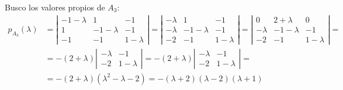 \begin{ejercicio}
\begin{enumerate}
        Busco los valores propios de $A_3$:
        \begin{equation*}\begin{split}
            p_{A_3}(\lambda)&
            =\left|\begin{array}{ccc}
                -1-\lambda & 1 & -1 \\
                1 & -1-\lambda & -1 \\
                -1 & -1 & 1-\lambda
            \end{array}\right|
            =\left|\begin{array}{ccc}
                -\lambda & 1 & -1 \\
                -\lambda & -1-\lambda & -1 \\
                -2 & -1 & 1-\lambda
            \end{array}\right|
            =\left|\begin{array}{ccc}
                0 & 2+\lambda & 0 \\
                -\lambda & -1-\lambda & -1 \\
                -2 & -1 & 1-\lambda
            \end{array}\right| =\\
            & =-(2+\lambda) \left|\begin{array}{cc}
                -\lambda & -1 \\
                -2 & 1-\lambda
            \end{array}\right|
            =-(2+\lambda) \left|\begin{array}{cc}
                -\lambda & -1 \\
                -2 & 1-\lambda
            \end{array}\right|=\\&=-(2+\lambda)(\lambda^2-\lambda-2) =-(\lambda+2)(\lambda-2)(\lambda+1)
        \end{split}\end{equation*}


\end{enumerate}
\end{ejercicio}
